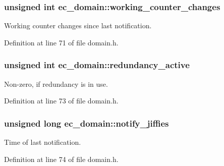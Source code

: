 \subsubsection[{working\-\_\-counter\-\_\-changes}]{\setlength{\rightskip}{0pt plus 5cm}unsigned int ec\-\_\-domain\-::working\-\_\-counter\-\_\-changes}\label{structec__domain_abe70425a9c3e701f4b561d0baac2e29c}


Working counter changes since last notification. 



Definition at line 71 of file domain.\-h.

\subsubsection[{redundancy\-\_\-active}]{\setlength{\rightskip}{0pt plus 5cm}unsigned int ec\-\_\-domain\-::redundancy\-\_\-active}\label{structec__domain_aeb8f64931c44dc2c89521b94f54879d6}


Non-\/zero, if redundancy is in use. 



Definition at line 73 of file domain.\-h.

\subsubsection[{notify\-\_\-jiffies}]{\setlength{\rightskip}{0pt plus 5cm}unsigned long ec\-\_\-domain\-::notify\-\_\-jiffies}\label{structec__domain_a5d14409ef398792e134f5b4f170a9f5c}


Time of last notification. 



Definition at line 74 of file domain.\-h.

